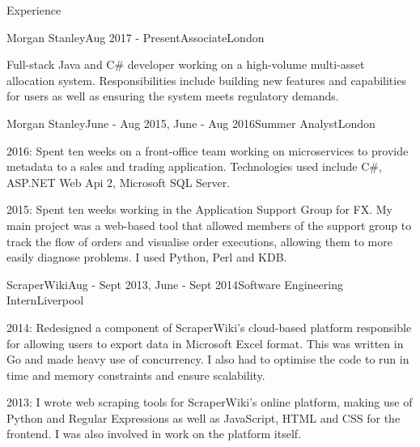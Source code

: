 \documentclass{resume}
\begin{document}
	\begin{rSection}{Experience}  
	    \begin{rSubsection}{Morgan Stanley}{Aug 2017 - Present}{Associate}{London}
	    \item Full-stack Java and C\# developer working on a high-volume multi-asset allocation system. Responsibilities include building new features and capabilities for users as well as ensuring the system meets regulatory demands.
	    \end{rSubsection}
	  
	    \begin{rSubsection}{Morgan Stanley}{June - Aug 2015, June - Aug 2016}{Summer Analyst}{London}
	    \item 2016: Spent ten weeks on a front-office team working on microservices to provide metadata to a sales and trading application. Technologies used include C\#, ASP.NET Web Api 2, Microsoft SQL Server.
	    \item 2015: Spent ten weeks working in the Application Support Group for FX. My main project was a web-based tool that allowed members of the support group to track the flow of orders and visualise order executions, allowing them to more easily diagnose problems. I used Python, Perl and KDB.
		\end{rSubsection}
		
	    \begin{rSubsection}{ScraperWiki}{Aug - Sept 2013, June - Sept 2014}{Software Engineering Intern}{Liverpool}
		\item 2014: Redesigned a component of ScraperWiki's cloud-based platform responsible for allowing users to export data in Microsoft Excel format. This was written in Go and made heavy use of concurrency. I also had to optimise the code to run in time and memory constraints and ensure scalability.
		\item 2013: I wrote web scraping tools for ScraperWiki's online platform, making use of Python and Regular Expressions as well as JavaScript, HTML and CSS for the frontend. I was also involved in work on the platform itself.
	    \end{rSubsection}
	\end{rSection}
    
\end{document}

